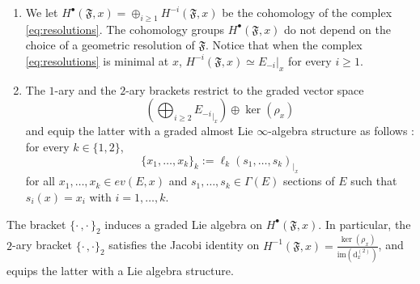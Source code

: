 \documentclass[10pt]{article}
\theoremstyle{plain}
\theoremstyle{definition}
\theoremstyle{remark}
\newcommand{\dd}{\mathrm{d}}
\begin{document}
\begin{enumerate}
  \begin{enumerate}
  \item We let $H^\bullet(\mathfrak F,x)=\oplus_{i\geq 1}H^{-i}(\mathfrak{F},x)$ be the cohomology of the complex \eqref{eq:resolutions}. The cohomology groups $H^\bullet(\mathfrak F,x)$ do not depend on the choice of a geometric resolution of $\mathfrak{F}$. Notice that when the complex \eqref{eq:resolutions} is minimal at $x$, $H^{-i}(\mathfrak{F},x)\simeq E_{-i}|_x$ for every $i\geq 1$.
      \item The $1$-ary and the $2$-ary brackets restrict to the graded vector space $$\left(\bigoplus_{i\geq 2} {E_{-i}}_{|_x}\right)\oplus \ker (\rho_{x})$$
and equip the latter with a graded almost  Lie $\infty$-algebra structure as follows : for every $k\in \{1,2\}$,
\begin{equation*}
    \{x_1,\ldots,x_k\}_k :=\ell_k(s_1,\ldots,s_k)_{|_x}
\end{equation*}
for all $x_1,\ldots,x_k\in ev(E,x) $ and $s_1,\ldots,s_k\in \Gamma(E)$ sections of $E$ such that ${s_i}(x)=x_i$ with $i=1,\ldots,k$.
  \end{enumerate}
The bracket $\{\cdot\,,\cdot\,\}_2$ induces a graded Lie algebra on $H^\bullet(\mathfrak F,x)$. In particular, the $2$-ary bracket $\{\cdot\,,\cdot\}_2$ satisfies the Jacobi identity on $H^{-1}(\mathfrak F,x)=\frac{\ker(\rho_x)}{\mathrm{im}(\dd^{(2)}_{x})}$, and equips the latter with a Lie algebra structure.
  

\end{enumerate}
\end{document}

